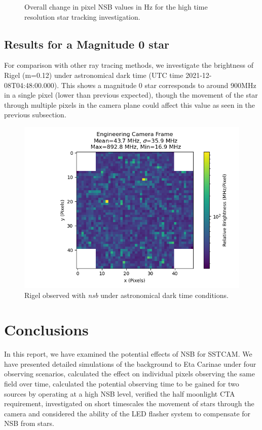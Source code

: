 \begin{figure}[ht]
\begin{minipage}{\linewidth}
\caption{Overall change in pixel NSB values in Hz for the high time resolution star tracking investigation.}

\end{minipage}
\label{fig:zenithpixelchange}
\end{figure} 

\subsection{Results for a Magnitude 0 star}
For comparison with other ray tracing methods, we investigate the brightness of Rigel (m=0.12) under astronomical dark time (UTC time 2021-12-08T04:48:00.000). This shows a magnitude 0 star corresponds to around 900MHz in a single pixel (lower than previous expected), though the movement of the star through multiple pixels in the camera plane could affect this value as seen in the previous subsection.
\begin{figure}[h]
\begin{centering}
\includegraphics[width=0.7\columnwidth]{./figures/Hz_pixel_Rigel.png}
\caption{Rigel observed with \textit{nsb} under astronomical dark time conditions.}
\label{fig:rigel}
\end{centering}
\end{figure}
\section{Conclusions}

In this report, we have examined the potential effects of NSB for SSTCAM. We have presented detailed simulations of the background to Eta Carinae under four observing scenarios, calculated the effect on individual pixels observing the same field over time, calculated the potential observing time to be gained for two sources by operating at a high NSB level, verified the half moonlight CTA requirement, investigated on short timescales the movement of stars through the camera and considered the ability of the LED flasher system to compensate for NSB from stars.

